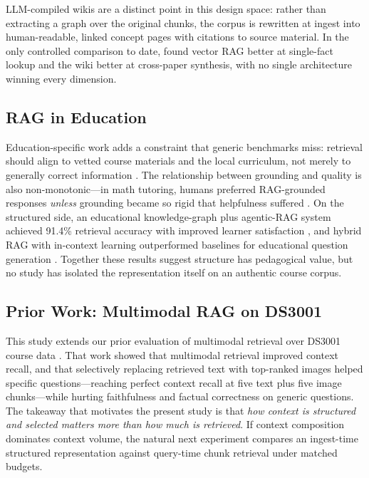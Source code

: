\documentclass[letterpaper]{article} %
\begin{document}
LLM-compiled wikis are a distinct point in this design space: rather than extracting a graph over the original chunks, the corpus is rewritten at ingest into human-readable, linked concept pages with citations to source material. In the only controlled comparison to date, \citet{cochran2026vector} found vector RAG better at single-fact lookup and the wiki better at cross-paper synthesis, with no single architecture winning every dimension.

\subsection{RAG in Education}

Education-specific work adds a constraint that generic benchmarks miss: retrieval should align to vetted course materials and the local curriculum, not merely to generally correct information \citep{li2025retrieval,jain2025aligning}. The relationship between grounding and quality is also non-monotonic---in math tutoring, humans preferred RAG-grounded responses \emph{unless} grounding became so rigid that helpfulness suffered \citep{levonian2023retrieval}. On the structured side, an educational knowledge-graph plus agentic-RAG system achieved 91.4\% retrieval accuracy with improved learner satisfaction \citep{gao2025karag}, and hybrid RAG with in-context learning outperformed baselines for educational question generation \citep{maity2024leveraging}. Together these results suggest structure has pedagogical value, but no study has isolated the representation itself on an authentic course corpus.

\subsection{Prior Work: Multimodal RAG on DS3001}

This study extends our prior evaluation of multimodal retrieval over DS3001 course data \citep{wright2026multimodal}. That work showed that multimodal retrieval improved context recall, and that selectively replacing retrieved text with top-ranked images helped specific questions---reaching perfect context recall at five text plus five image chunks---while hurting faithfulness and factual correctness on generic questions. The takeaway that motivates the present study is that \emph{how context is structured and selected matters more than how much is retrieved}. If context composition dominates context volume, the natural next experiment compares an ingest-time structured representation against query-time chunk retrieval under matched budgets.
\end{document}
